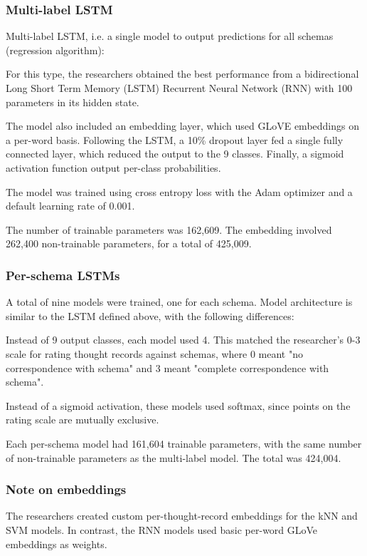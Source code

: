 \documentclass[11pt,a4paper]{article}
\begin{document}
\subsubsection{Multi-label LSTM}
Multi-label LSTM, i.e. a single model to output predictions for all schemas (regression algorithm):

For this type, the researchers obtained the best performance from a bidirectional Long Short Term Memory (LSTM) Recurrent Neural Network (RNN) with 100 parameters in its hidden state.

The model also included an embedding layer, which used GLoVE embeddings on a per-word basis. Following the LSTM, a 10\% dropout layer fed a single fully connected layer, which reduced the output to the 9 classes. Finally, a sigmoid activation function output per-class probabilities. 

The model was trained using cross entropy loss with the Adam optimizer and a default learning rate of 0.001.

The number of trainable parameters was 162,609. The embedding involved 262,400 non-trainable parameters, for a total of 425,009.

\subsubsection{Per-schema LSTMs}
A total of nine models were trained, one for each schema. Model architecture is similar to the LSTM defined above, with the following differences:

Instead of 9 output classes, each model used 4. This matched the researcher's 0-3 scale for rating thought records against schemas, where 0 meant "no correspondence with schema" and 3 meant "complete correspondence with schema".

Instead of a sigmoid activation, these models used softmax, since points on the rating scale are mutually exclusive.

Each per-schema model had 161,604 trainable parameters, with the same number of non-trainable parameters as the multi-label model. The total was 424,004.

\subsubsection{Note on embeddings}
The researchers created custom per-thought-record embeddings for the kNN and SVM models. In contrast, the RNN models used basic per-word GLoVe embeddings as weights.
\end{document}
